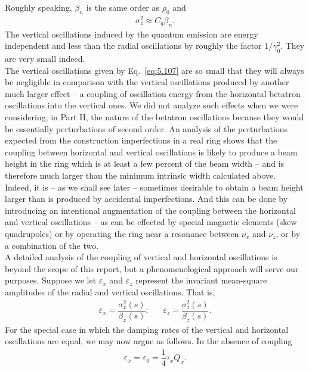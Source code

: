 Roughly speaking, $\beta_n$ is the same order as $\rho_0$ and
\begin{align}
	\sigma_z^2 \approx C_q \beta_n.
\end{align}
The vertical oscillations induced by the quantum emission are energy independent and less than the radial oscillations by roughly the factor $1/\gamma_0^2$. They are very small indeed.\\
The vertical oscillations given by Eq.~\eqref{eq:5.107} are so small that they will always be negligible in comparison with the vertical oscillations produced by another much larger effect -- a coupling of oscillation energy from the horizontal betatron oscillations into the vertical
 ones. We did not analyze such effects when we were considering, in Part II, the nature of the betatron oscillations because they would be essentially perturbations of second order. An analysis of the perturbations expected from the construction imperfections in a real ring shows that the coupling between horizontal and vertical oscillations is likely to produce a beam height in the ring which is at least a few percent of the beam width -- and is therefore much larger than the minimum intrinsic width calculated above.\\
Indeed, it is -- as we shall see later -- sometimes desirable to obtain a beam height larger than is produced by accidental imperfections. And this can be done by introducing an intentional
 augmentation of the coupling between the horizontal and vertical oscillations -- as can be effected by special magnetic elements (skew quadrupoles) or by operating the ring near a resonance between $\nu_x$ and $\nu_z$, or by a combination of the two.\\
A detailed analysis of the coupling of vertical and horizontal oscillations is beyond the scope of this report, but a phenomenological approach will serve our purposes. Suppose we let $\varepsilon_x$ and $\varepsilon_z$ represent the invariant mean-square amplitudes of the radial and vertical oscillations. That is,
\begin{align} \label{eq:5.109}
	\varepsilon_x = \dfrac{\sigma_x^2(s)}{\beta_x(s)}; && \varepsilon_z = \dfrac{\sigma_z^2(s)}{\beta_z(s)}.
\end{align}
For the special case in which the damping rates of the vertical and horizontal oscillations are equal, we may now argue as follows. In the absence of coupling
\begin{align}
	\varepsilon_x = \varepsilon_0 = \dfrac{1}{4} \tau_x Q_x.
\end{align}
